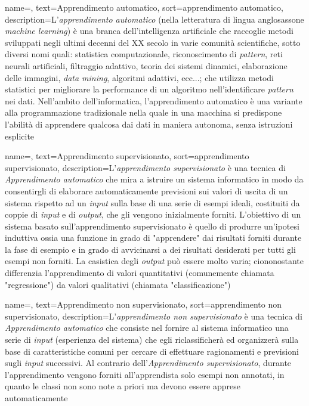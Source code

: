 {
    name=,
    text=Apprendimento automatico,
    sort=apprendimento automatico,
    description={L'\textit{apprendimento automatico} (nella letteratura di lingua anglosassone \textit{machine learning}) è una branca dell'intelligenza artificiale che raccoglie metodi sviluppati negli ultimi decenni del XX secolo in varie comunità scientifiche, sotto diversi nomi quali: statistica computazionale, riconoscimento di \textit{pattern}, reti neurali artificiali, filtraggio adattivo, teoria dei sistemi dinamici, elaborazione delle immagini, \textit{data mining}, algoritmi adattivi, ecc...; che utilizza metodi statistici per migliorare la performance di un algoritmo nell'identificare \textit{pattern} nei dati. Nell'ambito dell'informatica, l'apprendimento automatico è una variante alla programmazione tradizionale nella quale in una macchina si predispone l'abilità di apprendere qualcosa dai dati in maniera autonoma, senza istruzioni esplicite}
}

{
    name=,
    text=Apprendimento supervisionato,
    sort=apprendimento supervisionato,
    description={L'\textit{apprendimento supervisionato} è una tecnica di \textit{\gls{Apprendimento automatico}} che mira a istruire un sistema informatico in modo da consentirgli di elaborare automaticamente previsioni sui valori di uscita di un sistema rispetto ad un \textit{input} sulla base di una serie di esempi ideali, costituiti da coppie di \textit{input} e di \textit{output}, che gli vengono inizialmente forniti. L'obiettivo di un sistema basato sull'apprendimento supervisionato è quello di produrre un'ipotesi induttiva ossia una funzione in grado di "apprendere" dai risultati forniti durante la fase di esempio e in grado di avvicinarsi a dei risultati desiderati per tutti gli esempi non forniti. La casistica degli \textit{output} può essere molto varia; ciononostante differenzia l'apprendimento di valori quantitativi (comunemente chiamata "regressione") da valori qualitativi (chiamata "classificazione")}
}

{
    name=,
    text=Apprendimento non supervisionato,
    sort=apprendimento non supervisionato,
    description={L'\textit{apprendimento non supervisionato} è una tecnica di \textit{\gls{Apprendimento automatico}} che consiste nel fornire al sistema informatico una serie di \textit{input} (esperienza del sistema) che egli riclassificherà ed organizzerà sulla base di caratteristiche comuni per cercare di effettuare ragionamenti e previsioni sugli \textit{input} successivi. Al contrario dell'\textit{\gls{Apprendimento supervisionato}}, durante l'apprendimento vengono forniti all'apprendista solo esempi non annotati, in quanto le classi non sono note a priori ma devono essere apprese automaticamente}
}

